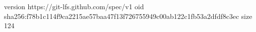 version https://git-lfs.github.com/spec/v1
oid sha256:f78b1c114f9ca2215ae57baa47f13f726755949c00ab122c1fb53a2dfdf8c3ec
size 124

